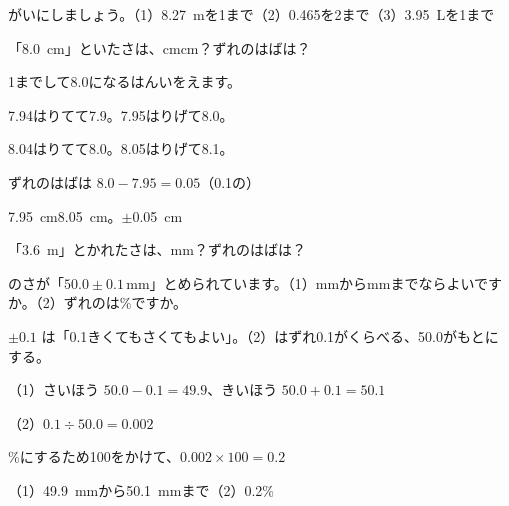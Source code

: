 \begin{jibun}
がいにしましょう。（1）\qty{8.27}{m}を1まで（2）0.465を2まで（3）\qty{3.95}{L}を1まで
\end{jibun}

\begin{reidai}
「\qty{8.0}{cm}」といたさは、cmcm？ずれのはばは？\par
\kangaekata {}1までして8.0になるはんいをえます。\par
\shiki 7.94はりてて7.9。7.95はりげて8.0。\par
\hspace*{2.6\zw}8.04はりてて8.0。8.05はりげて8.1。\par
\hspace*{2.6\zw}ずれのはばは $8.0-7.95=0.05$\quad（0.1の）\par
\kotae \qty{7.95}{cm}\qty{8.05}{cm}。$\pm$\qty{0.05}{cm}
\end{reidai}

\begin{jibun}
「\qty{3.6}{m}」とかれたさは、mm？ずれのはばは？
\end{jibun}

\begin{reidai}
のさが「$50.0\pm0.1$\,mm」とめられています。（1）mmからmmまでならよいですか。（2）ずれのは\%ですか。\par
\kangaekata $\pm0.1$ は「0.1きくてもさくてもよい」。（2）はずれ0.1がくらべる、50.0がもとにする。\par
\shiki（1）さいほう $50.0-0.1=49.9$、きいほう $50.0+0.1=50.1$\par
\hspace*{2.6\zw}（2）$0.1\div50.0=0.002$\par
\hspace*{2.6\zw}\phantom{（2）}\%にするため100をかけて、$0.002\times100=0.2$\par
\kotae（1）\qty{49.9}{mm}から\qty{50.1}{mm}まで\quad（2）0.2\%
\end{reidai}

